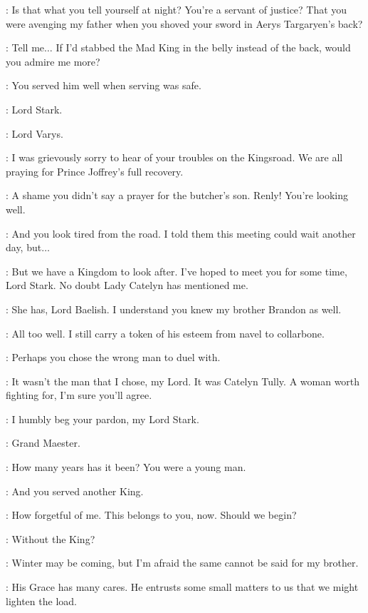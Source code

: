 \NED: Is that what you tell yourself at night? You're a servant of justice? That you were avenging my father when you shoved your sword in Aerys Targaryen's back? 

\JAIME: Tell me$\ldots$ If I'd stabbed the Mad King in the belly instead of the back, would you admire me more? 

\NED: You served him well when serving was safe. 


\VARYS: Lord Stark. 

\NED: Lord Varys. 

\VARYS: I was grievously sorry to hear of your troubles on the Kingsroad. We are all praying for Prince Joffrey's full recovery. 

\NED: A shame you didn't say a prayer for the butcher's son. Renly! You're looking well. 

\RENLY: And you look tired from the road. I told them this meeting could wait another day, but$\ldots$ 

\LITTLEFINGER: But we have a Kingdom to look after. I've hoped to meet you for some time, Lord Stark. No doubt Lady Catelyn has mentioned me. 

\NED: She has, Lord Baelish. I understand you knew my brother Brandon as well. 

\LITTLEFINGER: All too well. I still carry a token of his esteem from navel to collarbone. 

\NED: Perhaps you chose the wrong man to duel with. 

\LITTLEFINGER: It wasn't the man that I chose, my Lord. It was Catelyn Tully. A woman worth fighting for, I'm sure you'll agree. 

\PYCELLE: I humbly beg your pardon, my Lord Stark. 

\NED: Grand Maester. 

\PYCELLE: How many years has it been? You were a young man. 

\NED: And you served another King. 

\PYCELLE: How forgetful of me.  This belongs to you, now. Should we begin? 

\NED: Without the King? 

\RENLY: Winter may be coming, but I'm afraid the same cannot be said for my brother. 

\VARYS: His Grace has many cares. He entrusts some small matters to us that we might lighten the load. 

